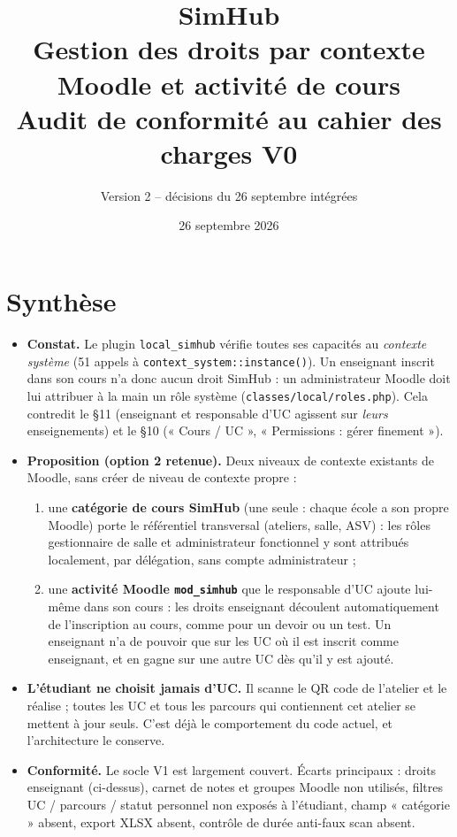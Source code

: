 \documentclass[11pt,a4paper]{article}
\title{\textbf{SimHub}\\[0.3em]\large Gestion des droits par contexte Moodle et activité de cours\\ Audit de conformité au cahier des charges V0}
\author{Version 2 -- décisions du 26 septembre intégrées}
\date{26 septembre 2026}
\newcommand{\code}[1]{\texttt{\small #1}}
\begin{document}
\maketitle

\section*{Synthèse}
\begin{itemize}
  \item \textbf{Constat.} Le plugin \code{local\_simhub} vérifie toutes ses capacités au
  \emph{contexte système} (51 appels à \code{context\_system::instance()}). Un enseignant
  inscrit dans son cours n'a donc aucun droit SimHub : un administrateur Moodle doit lui
  attribuer à la main un rôle système (\code{classes/local/roles.php}). Cela contredit le
  §11 (enseignant et responsable d'UC agissent sur \emph{leurs} enseignements) et le §10
  (« Cours / UC », « Permissions : gérer finement »).
  \item \textbf{Proposition (option 2 retenue).} Deux niveaux de contexte existants de
  Moodle, sans créer de niveau de contexte propre :
  \begin{enumerate}
    \item une \textbf{catégorie de cours SimHub} (une seule : chaque école a son propre
    Moodle) porte le référentiel transversal (ateliers, salle, ASV) : les rôles gestionnaire
    de salle et administrateur fonctionnel y sont attribués localement, par délégation, sans
    compte administrateur ;
    \item une \textbf{activité Moodle \code{mod\_simhub}} que le responsable d'UC ajoute
    lui-même dans son cours : les droits enseignant découlent automatiquement de
    l'inscription au cours, comme pour un devoir ou un test. Un enseignant n'a de pouvoir
    que sur les UC où il est inscrit comme enseignant, et en gagne sur une autre UC dès
    qu'il y est ajouté.
  \end{enumerate}
  \item \textbf{L'étudiant ne choisit jamais d'UC.} Il scanne le QR code de l'atelier et le
  réalise ; toutes les UC et tous les parcours qui contiennent cet atelier se mettent à jour
  seuls. C'est déjà le comportement du code actuel, et l'architecture le conserve.
  \item \textbf{Conformité.} Le socle V1 est largement couvert. Écarts principaux : droits
  enseignant (ci-dessus), carnet de notes et groupes Moodle non utilisés, filtres UC /
  parcours / statut personnel non exposés à l'étudiant, champ « catégorie » absent,
  export XLSX absent, contrôle de durée anti-faux scan absent.
\end{itemize}
\end{document}
